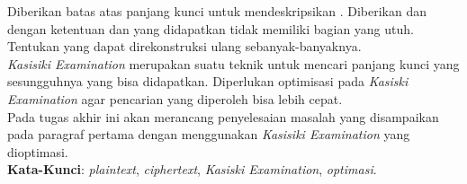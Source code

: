 \begin{abstrak}
		\indent Diberikan batas atas panjang kunci untuk mendeskripsikan \ciphertext. Diberikan \plaintext dan \ciphertext dengan ketentuan \ciphertext dan \plaintext yang didapatkan tidak memiliki bagian yang utuh. Tentukan \plaintext yang dapat direkonstruksi ulang sebanyak-banyaknya.
\\
\indent \textit{Kasisiki Examination} merupakan suatu teknik untuk mencari panjang kunci yang sesungguhnya yang bisa didapatkan. Diperlukan optimisasi pada \textit{Kasiski Examination} agar pencarian yang diperoleh bisa lebih cepat.
\\
\indent Pada tugas akhir ini akan merancang penyelesaian masalah yang disampaikan pada paragraf pertama dengan menggunakan \textit{Kasisiki Examination} yang dioptimasi.
\\
\noindent \textbf{Kata-Kunci}: \textit{plaintext}, \textit{ciphertext}, \textit{Kasiski Examination}, \textit{optimasi}.
\end{abstrak}


